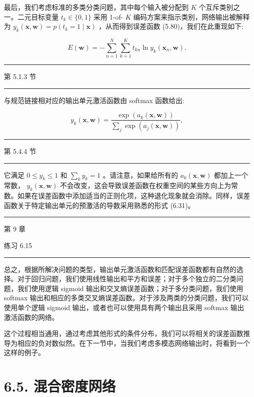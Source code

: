 \documentclass[10pt]{article}
\newcommand{\HRule}{\begin{center}\rule{0.9\linewidth}{0.2mm}\end{center}}
\begin{document}
最后，我们考虑标准的多类分类问题，其中每个输入被分配到 \(K\) 个互斥类别之一。二元目标变量 \({t}_{k} \in  \{ 0,1\}\) 采用 1-of- \(K\) 编码方案来指示类别，网络输出被解释为 \({y}_{k}\left( {\mathbf{x},\mathbf{w}}\right)  = p\left( {{t}_{k} = 1 \mid  \mathbf{x}}\right)\) ，从而得到误差函数 (5.80)，我们在此重现如下:

\[
E\left( \mathbf{w}\right)  =  - \mathop{\sum }\limits_{{n = 1}}^{N}\mathop{\sum }\limits_{{k = 1}}^{K}{t}_{kn}\ln {y}_{k}\left( {{\mathbf{x}}_{n},\mathbf{w}}\right) . \tag{6.36}
\]

\HRule

第 5.1.3 节

\HRule

与规范链接相对应的输出单元激活函数由 softmax 函数给出:

\[
{y}_{k}\left( {\mathbf{x},\mathbf{w}}\right)  = \frac{\exp \left( {{a}_{k}\left( {\mathbf{x},\mathbf{w}}\right) }\right) }{\mathop{\sum }\limits_{j}\exp \left( {{a}_{j}\left( {\mathbf{x},\mathbf{w}}\right) }\right) }, \tag{6.37}
\]

\HRule

第 5.4.4 节

\HRule

它满足 \(0 \leq  {y}_{k} \leq  1\) 和 \(\mathop{\sum }\limits_{k}{y}_{k} = 1\) 。请注意，如果给所有的 \({a}_{k}\left( {\mathbf{x},\mathbf{w}}\right)\) 都加上一个常数， \({y}_{k}\left( {\mathbf{x},\mathbf{w}}\right)\) 不会改变，这会导致误差函数在权重空间的某些方向上为常数。如果在误差函数中添加适当的正则化项，这种退化现象就会消除。同样，误差函数关于特定输出单元的预激活的导数采用熟悉的形式 (6.31)。

\HRule

第 9 章

练习 6.15

\HRule

总之，根据所解决问题的类型，输出单元激活函数和匹配误差函数都有自然的选择。对于回归问题，我们使用线性输出和平方和误差；对于多个独立的二分类问题，我们使用逻辑 sigmoid 输出和交叉熵误差函数；对于多分类问题，我们使用 softmax 输出和相应的多类交叉熵误差函数。对于涉及两类的分类问题，我们可以使用单个逻辑 sigmoid 输出，或者也可以使用具有两个输出且采用 softmax 输出激活函数的网络。

这个过程相当通用，通过考虑其他形式的条件分布，我们可以将相关的误差函数推导为相应的负对数似然。在下一节中，当我们考虑多模态网络输出时，将看到一个这样的例子。

\section*{6.5. 混合密度网络}
\end{document}
